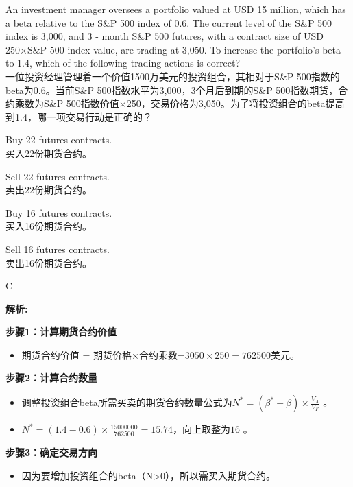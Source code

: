 \documentclass{article}
\newcounter{question} %
\newenvironment{explanation}
{\textbf{解析:}\par}
{\par}
\begin{document}
\begin{question}
    An investment manager oversees a portfolio valued at USD 15 million, which has a beta relative to the S\&P 500 index of 0.6. The current level of the S\&P 500 index is 3,000, and 3 - month S\&P 500 futures, with a contract size of USD 250×S\&P 500 index value, are trading at 3,050. To increase the portfolio's beta to 1.4, which of the following trading actions is correct?
    \\一位投资经理管理着一个价值1500万美元的投资组合，其相对于S\&P 500指数的beta为0.6。当前S\&P 500指数水平为3,000，3个月后到期的S\&P 500指数期货，合约乘数为S\&P 500指数价值×250，交易价格为3,050。为了将投资组合的beta提高到1.4，哪一项交易行动是正确的？
    \end{question}
    
    \begin{choices}
        \item Buy 22 futures contracts.\\
        买入22份期货合约。
        \item Sell 22 futures contracts.\\
        卖出22份期货合约。
        \item Buy 16 futures contracts.\\
        买入16份期货合约。
        \item Sell 16 futures contracts.\\
        卖出16份期货合约。
    \end{choices}
    
    \begin{correctanswer}
    C
    \end{correctanswer}
    
    \begin{explanation}    
    \textbf{步骤1：计算期货合约价值}
    \begin{itemize}
    \item 期货合约价值 = 期货价格×合约乘数=\(3050×250 = 762500\)美元。
    \end{itemize}
    \textbf{步骤2：计算合约数量}
    \begin{itemize}
    \item 调整投资组合beta所需买卖的期货合约数量公式为\(N^* = (\beta^* - \beta) \times \frac{V_A}{V_F}\) 。
    \item \(N^* = (1.4 - 0.6) \times \frac{15000000}{762500}=15.74\)，向上取整为\(16\) 。
    \end{itemize}
    \textbf{步骤3：确定交易方向}
    \begin{itemize}
    \item 因为要增加投资组合的beta（N>0），所以需买入期货合约。
    \end{itemize}
    \end{explanation}
    
\end{document}
